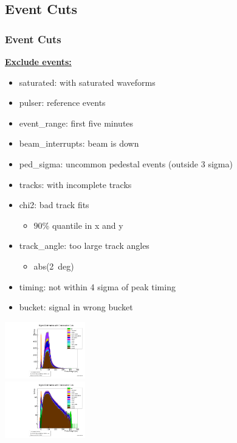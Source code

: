 \documentclass[9pt]{beamer}
\begin{document}
\subsection{Event Cuts}
\begin{frame}
	\frametitle{Event Cuts}
	\begin{minipage}[c][.7\textheight]{7cm}
		\underline{\textbf{Exclude events:}}\s
		\begin{itemize}
			\small
			\setlength{\itemsep}{\fill}
			\item saturated: with saturated waveforms
			\item pulser: reference events 
			\item event\_range: first five minutes
			\item beam\_interrupts: beam is down
			\item ped\_sigma: uncommon pedestal events (outside 3 sigma)
			\item tracks: with incomplete tracks
			\item chi2: bad track fits 
			\begin{itemize}
				\item $90$\% quantile in x and y
			\end{itemize}
			\item track\_angle: too large track angles
			\begin{itemize}
				\item abs(\SI{2}{deg})
			\end{itemize}
			\item timing: not within 4 sigma of peak timing
			\item bucket: signal in wrong bucket
		\end{itemize}
	\end{minipage}
	\hspace*{2pt}
	\begin{minipage}{4cm}
		\centering
		\includegraphics[angle=270, width=3.5cm]{consecutive398}\\
		\includegraphics[angle=270, width=3.5cm]{consecutive_logy398}
	\end{minipage}
\end{frame}
\end{document}
